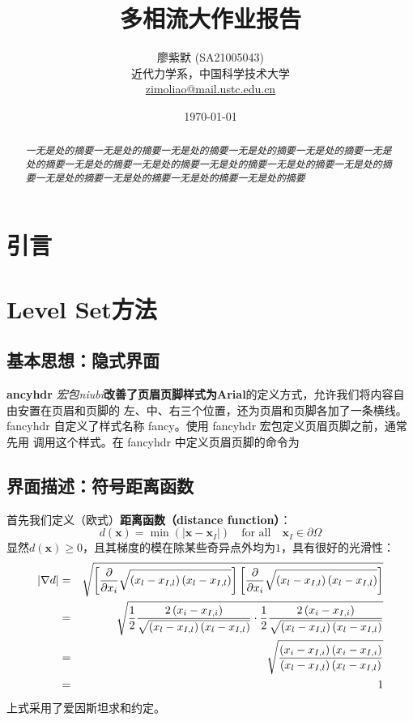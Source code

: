 \documentclass[11pt]{article}
\title{\LARGE\textbf{多相流大作业报告}}
\author{\normalsize 廖紫默 (SA21005043)\\
\small 近代力学系，中国科学技术大学\\
\small \href{mailto:zimoliao@mail.ustc.edu.cn}{zimoliao@mail.ustc.edu.cn}}
\date{\today}
\begin{document}
\maketitle
\thispagestyle{assignment-title}
\begin{abstract}
    \normalsize\it 一无是处的摘要一无是处的摘要一无是处的摘要一无是处的摘要一无是处的摘要一无是处的摘要一无是处的摘要一无是处的摘要一无是处的摘要一无是处的摘要一无是处的摘要一无是处的摘要一无是处的摘要一无是处的摘要一无是处的摘要
\end{abstract}

\tableofcontents


\newpage
{}
\setcounter{page}{1}
\section{引言}


\newpage
\section{Level Set方法}
\subsection{基本思想：隐式界面}
\textbf{ancyhdr} \textit{宏包niubi}\textbf{改善了页眉页脚样式为Arial}的定义方式，允许我们将内容自由安置在页眉和页脚的
左、中、右三个位置，还为页眉和页脚各加了一条横线。
fancyhdr 自定义了样式名称 fancy。使用 fancyhdr 宏包定义页眉页脚之前，通常先用  调用这个样式。在 fancyhdr 中定义页眉页脚的命令为

\subsection{界面描述：符号距离函数}
首先我们定义（欧式）\textbf{距离函数（distance function）}：
\begin{equation}
    d(\bm{x})=\min\left(\left|\bm{x}-\bm{x}_I\right|\right)\quad\text{for all}\quad \bm{x}_I\in\partial\Omega
\end{equation}
显然$d(\bm{x})\geq0$，且其梯度的模在除某些奇异点外均为$1$，具有很好的光滑性：
\begin{eqnarray}
    \left|\nabla d\right| &=& \sqrt{\left[\frac{\partial}{\partial x_i}\sqrt{\left(x_l-x_{I,l}\right)\left(x_l-x_{I,l}\right)}\right]\left[\frac{\partial}{\partial x_i}\sqrt{\left(x_l-x_{I,l}\right)\left(x_l-x_{I,l}\right)}\right]}\notag\\
    &=&\sqrt{\frac{1}{2}\frac{2\left(x_i-x_{I,i}\right)}{\sqrt{\left(x_l-x_{I,l}\right)\left(x_l-x_{I,l}\right)}}\cdot\frac{1}{2}\frac{2\left(x_i-x_{I,i}\right)}{\sqrt{\left(x_l-x_{I,l}\right)\left(x_l-x_{I,l}\right)}}}\notag\\
    &=&\sqrt{\frac{\left(x_i-x_{I,i}\right)\left(x_i-x_{I,i}\right)}{\left(x_l-x_{I,l}\right)\left(x_l-x_{I,l}\right)}}\notag\\
    &=&1
\end{eqnarray}
上式采用了爱因斯坦求和约定。
\end{document}
